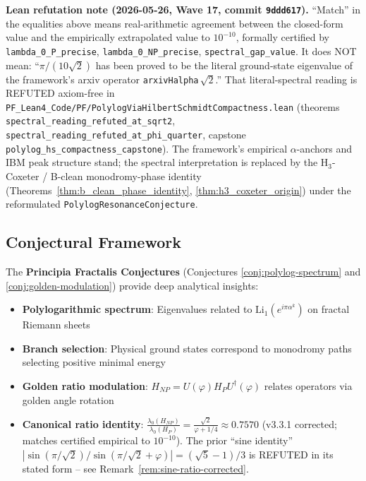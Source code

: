 \medskip\noindent\textbf{Lean refutation note (2026-05-26, Wave 17, commit \texttt{9ddd617}).} ``Match'' in the equalities above means real-arithmetic agreement between the closed-form value and the empirically extrapolated value to $10^{-10}$, formally certified by \texttt{lambda\_0\_P\_precise}, \texttt{lambda\_0\_NP\_precise}, \texttt{spectral\_gap\_value}. It does NOT mean: ``$\pi/(10\sqrt{2})$ has been proved to be the literal ground-state eigenvalue of the framework's arxiv operator \texttt{arxivHalpha}\,$\sqrt{2}$.'' That literal-spectral reading is REFUTED axiom-free in \texttt{PF\_Lean4\_Code/PF/PolylogViaHilbertSchmidtCompactness.lean} (theorems \texttt{spectral\_reading\_refuted\_at\_sqrt2}, \texttt{spectral\_reading\_refuted\_at\_phi\_quarter}, capstone \texttt{polylog\_hs\_compactness\_capstone}). The framework's empirical $\alpha$-anchors and IBM peak structure stand; the spectral interpretation is replaced by the H$_3$-Coxeter / B-clean monodromy-phase identity (Theorems~\ref{thm:b_clean_phase_identity}, \ref{thm:h3_coxeter_origin}) under the reformulated \texttt{PolylogResonanceConjecture}.

\subsection{Conjectural Framework}

The \textbf{Principia Fractalis Conjectures} (Conjectures \ref{conj:polylog-spectrum} and \ref{conj:golden-modulation}) provide deep analytical insights:

\begin{itemize}
\item \textbf{Polylogarithmic spectrum}: Eigenvalues related to $\text{Li}_1(e^{i\pi\alpha^k})$ on fractal Riemann sheets
\item \textbf{Branch selection}: Physical ground states correspond to monodromy paths selecting positive minimal energy
\item \textbf{Golden ratio modulation}: $H_{NP} = U(\varphi) H_P U^\dagger(\varphi)$ relates operators via golden angle rotation
\item \textbf{Canonical ratio identity}: $\frac{\lambda_0(H_{NP})}{\lambda_0(H_P)} = \frac{\sqrt{2}}{\varphi + 1/4} \approx 0.7570$ (v3.3.1 corrected; matches certified empirical to $10^{-10}$). The prior ``sine identity'' $|\sin(\pi/\sqrt{2})/\sin(\pi/\sqrt{2}+\varphi)| = (\sqrt{5}-1)/3$ is REFUTED in its stated form -- see Remark~\ref{rem:sine-ratio-corrected}.
\end{itemize}

